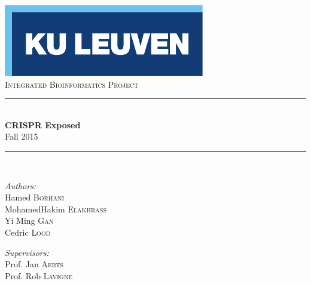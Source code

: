 \begin{titlepage}
  \begin{center}
    
    \includegraphics[scale=1.5]{figures/kuleuven_logo.pdf}~\\[4.5cm]
    
    \textsc{\Large Integrated Bioinformatics Project}\\[0.5cm]
    
    \rule{\linewidth}{0.3mm}\\[0.4cm]
    {\huge \bfseries CRISPR Exposed} \\[0.4cm]
    {\large Fall 2015} \\[0.4cm]
    \rule{\linewidth}{0.3mm}\\[1.5cm]
    
    \begin{minipage}{0.4\textwidth}
      \begin{flushleft} \large
        \emph{Authors:}\\
        Hamed \textsc{Borhani}\\
	MohamedHakim \textsc{Elakhrass}\\
	Yi Ming \textsc{Gan}\\
	Cedric \textsc{Lood}
      \end{flushleft}
    \end{minipage}
    \begin{minipage}{0.4\textwidth}
      \begin{flushright} \large
        \emph{Supervisors:} \\
        Prof. Jan \textsc{Aerts}\\
        Prof. Rob \textsc{Lavigne}\\
        \hfill \newline 
      \end{flushright}
    \end{minipage}
    
    \vfill
    

\end{center}
\end{titlepage}

